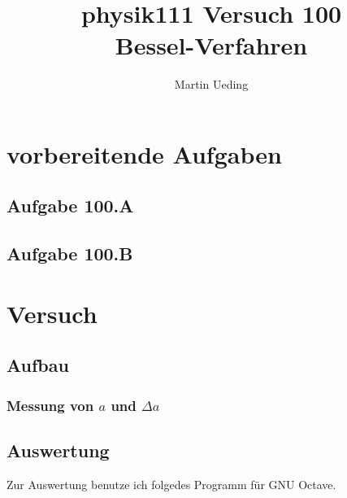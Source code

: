 \documentclass[11pt]{article}
\title{physik111 Versuch 100 \\ Bessel-Verfahren}
\author{Martin Ueding}
\begin{document}
\maketitle

\section{vorbereitende Aufgaben}

\subsection{Aufgabe 100.A}
\subsection{Aufgabe 100.B}

\section{Versuch}

\subsection{Aufbau}

\subsubsection*{Messung von $a$ und $\Delta a$}



\subsection{Auswertung}

Zur Auswertung benutze ich folgedes Programm für GNU Octave.


\end{document}
